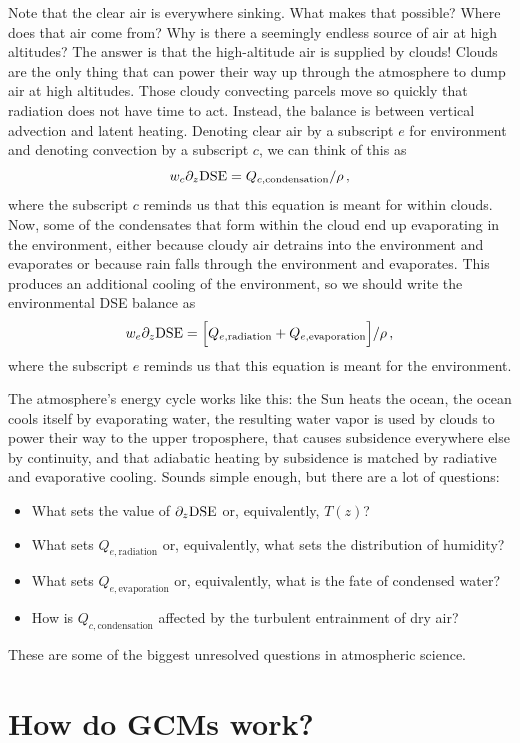 \documentclass[12pt]{article}
\newcommand{\dse}{{\text{DSE}}}
\begin{document}
Note that the clear air is everywhere sinking.  What makes that possible?  Where does that air come from?  Why is there a seemingly endless source of air at high altitudes?  The answer is that the high-altitude air is supplied by clouds!  Clouds are the only thing that can power their way up through the atmosphere to dump air at high altitudes.  Those cloudy convecting parcels move so quickly that radiation does not have time to act.  Instead, the balance is between vertical advection and latent heating.  Denoting clear air by a subscript $e$ for environment and denoting convection by a subscript $c$, we can think of this as
\[
w_c \ppz \dse = Q_{c,\text{condensation}} / \rho \, ,
\]
where the subscript $c$ reminds us that this equation is meant for within clouds.  Now, some of the condensates that form within the cloud end up evaporating in the environment, either because cloudy air detrains into the environment and evaporates or because rain falls through the environment and evaporates.  This produces an additional cooling of the environment, so we should write the environmental DSE balance as
\[
w_e \ppz \dse{} = \Big[ Q_{e,\text{radiation}} + Q_{e,\text{evaporation}} \Big] / \rho \, ,
\]
where the subscript $e$ reminds us that this equation is meant for the environment.


The atmosphere's energy cycle works like this: the Sun heats the ocean, the ocean cools itself by evaporating water, the resulting water vapor is used by clouds to power their way to the upper troposphere, that causes subsidence everywhere else by continuity, and that adiabatic heating by subsidence is matched by radiative and evaporative cooling.  Sounds simple enough, but there are a lot of questions:
\begin{itemize}
\item What sets the value of $\ppz \dse{}$ or, equivalently, $T(z)$?
\item What sets $Q_{e,\text{radiation}}$ or, equivalently, what sets the distribution of humidity?
\item What sets $Q_{e,\text{evaporation}}$ or, equivalently, what is the fate of condensed water?
\item How is $Q_{c,\text{condensation}}$ affected by the turbulent entrainment of dry air?
\end{itemize}
These are some of the biggest unresolved questions in atmospheric science.


\section{How do GCMs work?}
\end{document}
